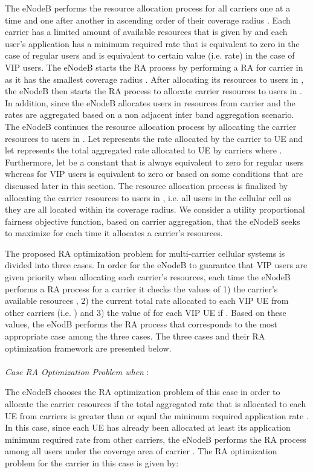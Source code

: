 \documentclass[journal]{IEEEtran} 				\IEEEoverridecommandlockouts 						\usepackage{amsmath,amssymb}
\begin{document}
The eNodeB performs the resource allocation process for all carriers one at a time and one after another in ascending order of their coverage radius . Each carrier  has a limited amount of available resources that is given by  and each user's application has a minimum required rate  that is equivalent to zero in the case of regular users and is equivalent to certain value (i.e. rate) in the case of VIP users. The eNodeB starts the RA process by performing a RA for carrier  in  as it has the smallest coverage radius . After allocating its resources to users in , the eNodeB then starts the RA process to allocate carrier  resources to users in . In addition, since  the eNodeB allocates users in  resources from carrier  and the rates are aggregated based on a non adjacent inter band aggregation scenario. The eNodeB continues the resource allocation process by allocating the  carrier resources to users in . Let  represents the rate allocated by the  carrier to UE  and let  represents the total aggregated rate allocated to UE  by carriers  where . Furthermore, let  be a constant that is always equivalent to zero for regular users whereas for VIP users  is equivalent to zero or  based on some conditions that are discussed later in this section. The resource allocation process is finalized by allocating the  carrier resources to users in , i.e. all users in the cellular cell as they are all located within its coverage radius. We consider a utility proportional fairness objective function, based on carrier aggregation, that the eNodeB seeks to maximize for each time it allocates a carrier's resources.

The proposed RA optimization problem for multi-carrier cellular systems is divided into three cases. In order for the eNodeB to guarantee that VIP users are given priority when allocating each carrier's resources, each time the eNodeB performs a RA process for a carrier it checks the values of 1) the carrier's available resources , 2) the current total rate allocated to each VIP UE  from other carriers (i.e. ) and 3) the value of  for each VIP UE  if . Based on these values, the eNodB performs the RA process that corresponds to the most appropriate case among the three cases. The three cases and their RA optimization framework are presented below.\\
\\\textit{Case RA Optimization Problem when }:


The eNodeB chooses the RA optimization problem of this case in order to allocate the  carrier resources if the total aggregated rate  that is allocated to each UE  from carriers  is greater than or equal the minimum required application rate . In this case, since each UE has already been allocated at least its application minimum required rate from other carriers, the eNodeB performs the RA process among all users under the coverage area of carrier . The RA optimization problem for the  carrier in this case is given by:
\end{document}

